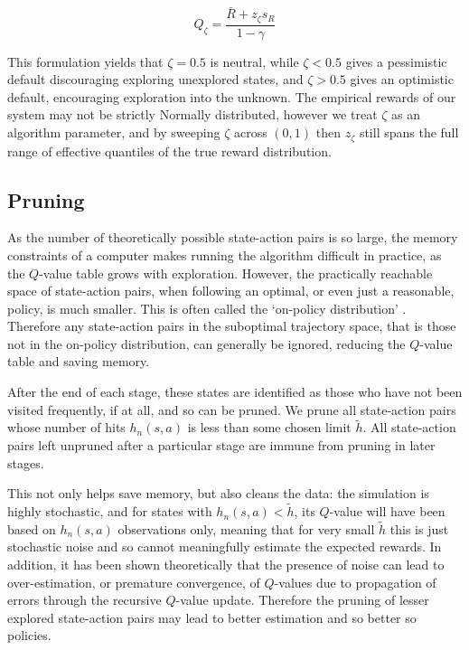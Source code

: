 \documentclass{article}
\begin{document}
\begin{equation}\label{eqn:defaultQ}
Q_{\zeta} = \frac{\bar{R} + z_{\zeta} s_R}{1 - \gamma}
\end{equation}

This formulation yields that $\zeta = 0.5$ is neutral, while $\zeta < 0.5$ gives
a pessimistic default discouraging exploring unexplored states, and
$\zeta > 0.5$ gives an optimistic default, encouraging exploration into the
unknown.
The empirical rewards of our system may not be strictly Normally distributed,
however we treat $\zeta$ as an algorithm parameter, and by sweeping $\zeta$
across $(0, 1)$ then $z_{\zeta}$ still spans the full range of effective
quantiles of the true reward distribution.


\subsection{Pruning}\label{sec:pruning}
As the number of theoretically possible state-action pairs is so large, the
memory constraints of a computer makes running the algorithm difficult in
practice, as the $Q$-value table grows with exploration.
However, the practically reachable space of state-action pairs, when following
an optimal, or even just a reasonable, policy, is much smaller.
This is often called the `on-policy distribution' \cite{suttonbarto1998}.
Therefore any state-action pairs in the suboptimal trajectory space, that is
those not in the on-policy distribution, can generally be ignored, reducing the
$Q$-value table and saving memory.

After the end of each stage, these states are identified as those who have not
been visited frequently, if at all, and so can be pruned.
We prune all state-action pairs whose number of hits $h_n(s, a)$ is less than
some chosen limit $\tilde{h}$.
All state-action pairs left unpruned after a particular stage are immune from
pruning in later stages.

This not only helps save memory, but also cleans the data: the simulation is
highly stochastic, and for states with $h_n(s, a) < \tilde{h}$, its $Q$-value
will have been based on $h_n(s, a)$ observations only, meaning that for very
small $\tilde{h}$ this is just stochastic noise and so cannot meaningfully
estimate the expected rewards.
In addition, it has been shown theoretically that the presence of noise can lead
to over-estimation, or premature convergence, of $Q$-values
\cite{thrunschwartz93} due to propagation of errors through the recursive
$Q$-value update.
Therefore the pruning of lesser explored state-action pairs may lead to better
estimation and so better so policies.
\end{document}
